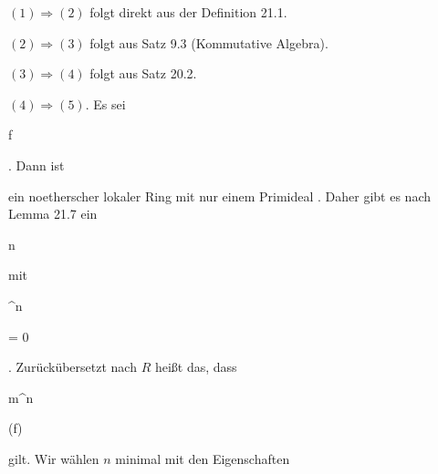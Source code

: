 {


$(1) \Rightarrow (2)$ folgt direkt aus der
Definition 21.1.


$(2) \Rightarrow (3)$ folgt aus
Satz 9.3 (Kommutative Algebra).


$(3) \Rightarrow (4)$ folgt aus
Satz 20.2.


$(4) \Rightarrow (5)$. Es sei

 {}

 {f } {}

 {} {} {} {.} Dann ist

 ein noetherscher lokaler Ring mit nur einem Primideal
 {} {.}
Daher gibt es nach
Lemma 21.7
ein


\mavergleichskette

{\vergleichskette

{n
}

{ \in }{\N
}

{  }{
}

{    }{
}

{   }{
}

}
{}{}{}
mit


\mavergleichskette

{\vergleichskette

{ ^n
}

{ = }{ 0
}

{  }{
}

{    }{
}

{   }{
}

}
{}{}{.}
Zurückübersetzt nach $R$ heißt das, dass


\mavergleichskette

{\vergleichskette

{ {\mathfrak m}^n
}

{ \subseteq }{ (f)
}

{  }{
}

{    }{
}

{   }{
}

}
{}{}{}
gilt. Wir wählen $n$ minimal mit den Eigenschaften


}
